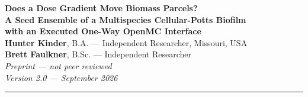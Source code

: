 \documentclass[11pt]{article}
\begin{document}
\begin{center}
  {\LARGE\bfseries Does a Dose Gradient Move Biomass Parcels?}\\[10pt]
  {\large\bfseries A Seed Ensemble of a Multispecies Cellular-Potts Biofilm\\
   with an Executed One-Way OpenMC Interface}\\[14pt]
  {\normalsize
    \textbf{Hunter Kinder}, B.A. --- Independent Researcher, Missouri, USA\\[2pt]
    \textbf{Brett Faulkner}, B.Sc. --- Independent Researcher\\[10pt]
  }
  {\small
    \textit{Preprint --- not peer reviewed}\\
    \textit{Version 2.0 --- September 2026}
  }
\end{center}
\vspace{4pt}
\noindent\rule{\linewidth}{0.5pt}
\vspace{2pt}
\end{document}
